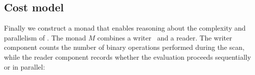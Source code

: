 \subsection{Cost model}
Finally we construct a monad that enables reasoning about the complexity and
parallelism of .  The monad $M$ combines a writer~\citep{monads} and a
reader.  The writer component counts the number of binary operations performed
during the scan, while the reader component records whether the evaluation
proceeds sequentially or in parallel:
\begin{code}[hide]%
\>[0]\AgdaSpace{}%
\AgdaSpace{}%
\<%
\\
\>[0][@{}l@{\AgdaIndent{0}}]%
\>[2]\AgdaSpace{}%
\AgdaSpace{}%
\AgdaSpace{}%
\AgdaSymbol{(}\AgdaSymbol{)}\<%
\\
%
\>[2]\AgdaSpace{}%
\AgdaSpace{}%
\AgdaSpace{}%
\AgdaSymbol{(}\AgdaSymbol{;}\AgdaSpace{}%
\AgdaSymbol{;}\AgdaSpace{}%
\AgdaSymbol{)}\<%
\\
%
\>[2]\AgdaSpace{}%
\AgdaSpace{}%
\AgdaSymbol{(}\AgdaSpace{}%
\AgdaSymbol{)}\<%
\\
%
\>[2]\AgdaSpace{}%
\AgdaSpace{}%
\<%
\\
%
\>[2]\AgdaSpace{}%
\<%
\\
%
\>[2]\AgdaSpace{}%
\AgdaSpace{}%
\<%
\\
%
\\[\AgdaEmptyExtraSkip]%
%
\>[2]\AgdaSpace{}%
\<%
\\
\>[2][@{}l@{\AgdaIndent{0}}]%
\>[4]\AgdaSpace{}%
\AgdaSpace{}%
\AgdaSymbol{:}\AgdaSpace{}%
\<%
\\
%
\>[4]\AgdaSpace{}%
\AgdaSpace{}%
\AgdaSymbol{:}\AgdaSpace{}%
\<%
\\
%
\>[4]\AgdaSpace{}%
\AgdaSpace{}%
\AgdaSymbol{:}\AgdaSpace{}%
\<%
\\
\>[0]\<%
\end{code}
